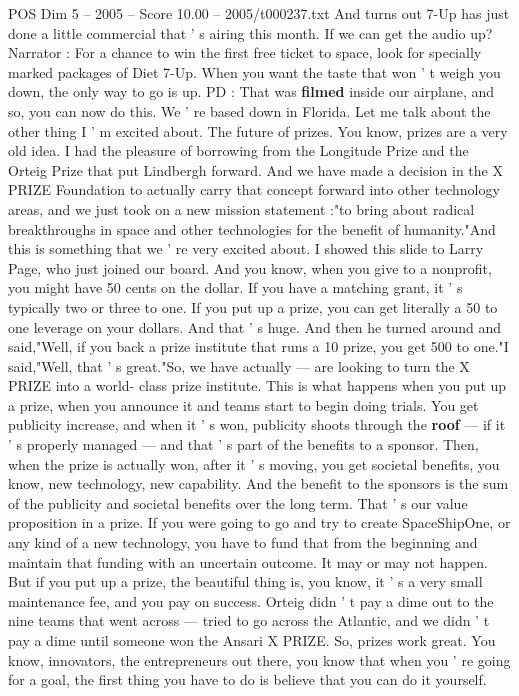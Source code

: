 \begin{textsample}{POS Dim 5 – 2005 – Score 10.00 – 2005/t000237.txt}
And turns out 7-Up has just done a little commercial that ' s airing this month.
If we can get the audio up?
Narrator : For a chance to win the first free ticket to space, look for specially marked packages of Diet 7-Up.
When you want the taste that won ' t weigh you down, the only way to go is up.
PD : That was \textbf{filmed} inside our airplane, and so, you can now do this.
We ' re based down in Florida.
Let me talk about the other thing I ' m excited about.
The future of prizes.
You know, prizes are a very old idea.
I had the pleasure of borrowing from the Longitude Prize and the Orteig Prize that put Lindbergh forward.
And we have made a decision in the X PRIZE Foundation to actually carry that concept forward into other technology areas, and we just took on a new mission statement :"to bring about radical breakthroughs in space and other technologies for the benefit of humanity."And this is something that we ' re very excited about.
I showed this slide to Larry Page, who just joined our board.
And you know, when you give to a nonprofit, you might have 50 cents on the dollar.
If you have a matching grant, it ' s typically two or three to one.
If you put up a prize, you can get literally a 50 to one leverage on your dollars.
And that ' s huge.
And then he turned around and said,"Well, if you back a prize institute that runs a 10 prize, you get 500 to one."I said,"Well, that ' s great."So, we have actually — are looking to turn the X PRIZE into a world- class prize institute.
This is what happens when you put up a prize, when you announce it and teams start to begin doing trials.
You get publicity increase, and when it ' s won, publicity shoots through the \textbf{roof} — if it ' s properly managed — and that ' s part of the benefits to a sponsor.
Then, when the prize is actually won, after it ' s moving, you get societal benefits, you know, new technology, new capability.
And the benefit to the sponsors is the sum of the publicity and societal benefits over the long term.
That ' s our value proposition in a prize.
If you were going to go and try to create SpaceShipOne, or any kind of a new technology, you have to fund that from the beginning and maintain that funding with an uncertain outcome.
It may or may not happen.
But if you put up a prize, the beautiful thing is, you know, it ' s a very small maintenance fee, and you pay on success.
Orteig didn ' t pay a dime out to the nine teams that went across — tried to go across the Atlantic, and we didn ' t pay a dime until someone won the Ansari X PRIZE.
So, prizes work great.
You know, innovators, the entrepreneurs out there, you know that when you ' re going for a goal, the first thing you have to do is believe that you can do it yourself.

\end{textsample}
